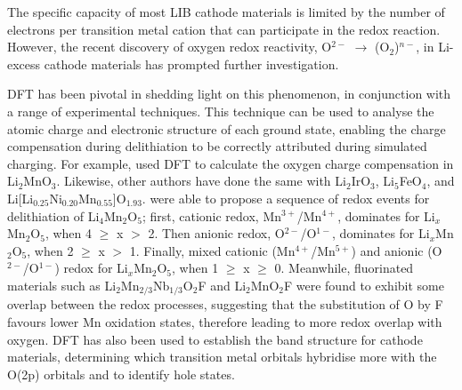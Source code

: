 \documentclass[../main.tex]{subfiles}
\begin{document}
The specific capacity of most LIB cathode materials is limited by the number of electrons per transition metal cation that can participate in the redox reaction. However, the recent discovery of oxygen redox reactivity, O$^{2-}$ $\to$ (O$_2$)$^{n-}$,  in Li-excess cathode materials\cite{Koga2013, Sathiya2013, Oishi2015, Sathiya2015, McCalla2015, Cao2015, Shimoda2016, Chen2016, Luo2016a, Hy2016, Muhammad2016, Seo2016, Gent2017, Zhan2017,  Zheng2017,Assat2018, BenYahia2019, naylor2019depth, Hua2019, House2019, Li2019, Eum2020, Gent2020, Sharpe2020} has prompted further investigation.

DFT has been pivotal in shedding light on this phenomenon, in conjunction with a range of experimental techniques. This technique can be used to analyse the atomic charge and electronic structure of each ground state, enabling the charge compensation during delithiation to be correctly attributed during simulated charging. For example, \citeauthor{Xiao2012} used DFT to calculate the oxygen charge compensation in Li$_2$MnO$_3$.\cite{Xiao2012} Likewise, other authors have done the same with Li$_2$IrO$_3$,\cite{Li2019} Li$_5$FeO$_4$,\cite{Zhan2017} and Li[Li$_{0.25}$Ni$_{0.20}$Mn$_{0.55}$]O$_{1.93}$.\cite{Shimoda2016} \citeauthor{Yao2018} were able to propose a sequence of redox events for delithiation of Li$_4$Mn$_2$O$_5$;\cite{Yao2018} first, cationic redox, Mn$^{3+}$/Mn$^{4+}$, dominates for Li$_x$Mn$_2$O$_5$, when 4 $\geq$ x $>$ 2. Then anionic redox, O$^{2-}$/O$^{1-}$, dominates for Li$_x$Mn$_2$O$_5$, when 2 $\geq$ x $>$ 1. Finally, mixed cationic (Mn$^{4+}$/Mn$^{5+}$) and anionic (O$^{2-}$/O$^{1-}$) redox for Li$_x$Mn$_2$O$_5$, when 1 $\geq$ x $\geq$ 0. Meanwhile, fluorinated materials such as Li$_2$Mn$_{2/3}$Nb$_{1/3}$O$_2$F\cite{Lee2018} and Li$_2$MnO$_2$F\cite{Sharpe2020} were found to exhibit some overlap between the redox processes, suggesting that the substitution of O by F favours lower Mn oxidation states, therefore leading to more redox overlap with oxygen. DFT has also been used to establish the band structure for cathode materials, determining which transition metal orbitals hybridise more with the O(2p) orbitals\cite{Cao2015, Sathiya2013a} and to identify hole states.\cite{Zhan2017, Xiao2012}
\end{document}
